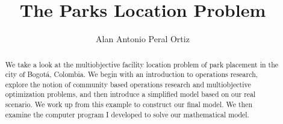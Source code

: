 \documentclass[12pt]{pom_thesis}
\author{Alan Antonio Peral Ortiz}
\title{The Parks Location Problem}
\theoremstyle{definition}
\begin{document}


\maketitle

\begin{abstract}We take a look at the multiobjective facility location problem of park placement in the city of Bogot\'{a}, Colombia. We begin with an introduction to operations research, explore the notion of community based operations research and multiobjective optimization problems, and then introduce a simplified model based on our real scenario. We work up from this example to construct our final model. We then examine the computer program I developed to solve our mathematical model.
\end{abstract}

\tableofcontents
\lstlistoflistings
\end{document}
